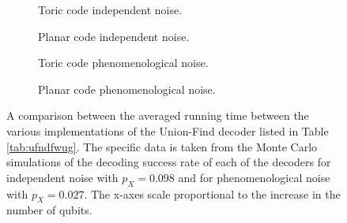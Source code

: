 \begin{figure}[htbp]
  \centering
  \begin{subfigure}[b]{0.49\textwidth}
    \begin{adjustbox}{Clip=0 1em 0 0}
      
    \end{adjustbox}
    \caption{Toric code independent noise.}
\end{subfigure}
\begin{subfigure}[b]{0.49\textwidth}
    \begin{adjustbox}{Clip=0 1em 0 0}
      
    \end{adjustbox}
    \caption{Planar code independent noise.}
\end{subfigure}
  \begin{subfigure}[b]{0.49\textwidth}
    \begin{adjustbox}{Clip=0 1em 0 0}
      
    \end{adjustbox}
    \caption{Toric code phenomenological noise.}
  \end{subfigure}
  \begin{subfigure}[b]{0.49\textwidth}
    \begin{adjustbox}{Clip=0 1em 0 0}
      
    \end{adjustbox}
    \caption{Planar code phenomenological noise.}
  \end{subfigure}
  \caption{A comparison between the averaged running time between the various implementations of the Union-Find decoder listed in Table \ref{tab:ufndfwug}. The specific data is taken from the Monte Carlo simulations of the decoding success rate of each of the decoders for independent noise with $p_X = 0.098$ and for phenomenological noise with $p_X = 0.027$. The x-axes scale proportional to the increase in the number of qubits.}\label{fig:tcomp_uf}
\end{figure}